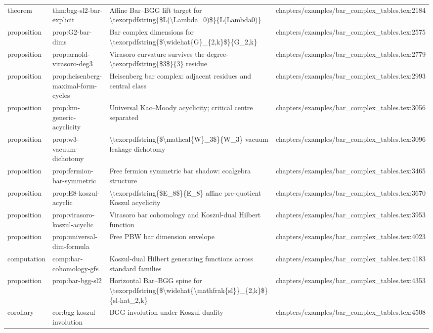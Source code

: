 \documentclass[11pt]{article}
\begin{document}
\begin{longtable}{L{0.10\textwidth}L{0.26\textwidth}L{0.42\textwidth}L{0.22\textwidth}}
theorem & thm:bgg-sl2-bar-explicit & Affine Bar--BGG lift target for \textbackslash{}texorpdfstring\{\$L(\textbackslash{}Lambda\_0)\$\}\{L(Lambda0)\} & chapters/examples/bar\_complex\_tables.tex:2184\\
proposition & prop:G2-bar-dims & Bar complex dimensions for \textbackslash{}texorpdfstring\{\$\textbackslash{}widehat\{G\}\_\{2,k\}\$\}\{G\_2,k\} & chapters/examples/bar\_complex\_tables.tex:2575\\
proposition & prop:arnold-virasoro-deg3 & Virasoro curvature survives the degree-\textbackslash{}texorpdfstring\{\$3\$\}\{3\} residue & chapters/examples/bar\_complex\_tables.tex:2779\\
proposition & prop:heisenberg-maximal-form-cycles & Heisenberg bar complex: adjacent residues and central class & chapters/examples/bar\_complex\_tables.tex:2993\\
proposition & prop:km-generic-acyclicity & Universal Kac--Moody acyclicity; critical centre separated & chapters/examples/bar\_complex\_tables.tex:3056\\
proposition & prop:w3-vacuum-dichotomy & \textbackslash{}texorpdfstring\{\$\textbackslash{}mathcal\{W\}\_3\$\}\{W\_3\} vacuum leakage dichotomy & chapters/examples/bar\_complex\_tables.tex:3096\\
proposition & prop:fermion-bar-symmetric & Free fermion symmetric bar shadow: coalgebra structure & chapters/examples/bar\_complex\_tables.tex:3465\\
proposition & prop:E8-koszul-acyclic & \textbackslash{}texorpdfstring\{\$E\_8\$\}\{E\_8\} affine pre-quotient Koszul acyclicity & chapters/examples/bar\_complex\_tables.tex:3670\\
proposition & prop:virasoro-koszul-acyclic & Virasoro bar cohomology and Koszul-dual Hilbert function & chapters/examples/bar\_complex\_tables.tex:3953\\
proposition & prop:universal-dim-formula & Free PBW bar dimension envelope & chapters/examples/bar\_complex\_tables.tex:4023\\
computation & comp:bar-cohomology-gfs & Koszul-dual Hilbert generating functions across standard families & chapters/examples/bar\_complex\_tables.tex:4183\\
proposition & prop:bar-bgg-sl2 & Horizontal Bar--BGG spine for \textbackslash{}texorpdfstring\{\$\textbackslash{}widehat\{\textbackslash{}mathfrak\{sl\}\}\_\{2,k\}\$\}\{sl-hat\_2,k\} & chapters/examples/bar\_complex\_tables.tex:4353\\
corollary & cor:bgg-koszul-involution & BGG involution under Koszul duality & chapters/examples/bar\_complex\_tables.tex:4508\\

\end{longtable}
\end{document}
